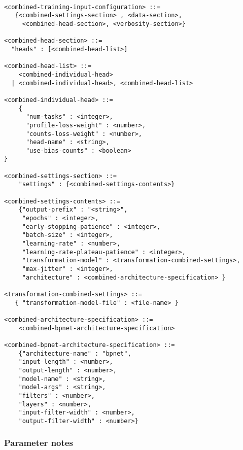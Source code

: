 \documentclass{article}
\begin{document}
\begin{lstlisting}

<combined-training-input-configuration> ::=
   {<combined-settings-section> , <data-section>,
     <combined-head-section>, <verbosity-section>}

<combined-head-section> ::=
  "heads" : [<combined-head-list>]

<combined-head-list> ::=
    <combined-individual-head>
  | <combined-individual-head>, <combined-head-list>

<combined-individual-head> ::=
    {
      "num-tasks" : <integer>,
      "profile-loss-weight" : <number>,
      "counts-loss-weight" : <number>,
      "head-name" : <string>,
      "use-bias-counts" : <boolean>
}

<combined-settings-section> ::=
    "settings" : {<combined-settings-contents>}

<combined-settings-contents> ::=
    {"output-prefix" : "<string>",
     "epochs" : <integer>,
     "early-stopping-patience" : <integer>,
     "batch-size" : <integer>,
     "learning-rate" : <number>,
     "learning-rate-plateau-patience" : <integer>,
     "transformation-model" : <transformation-combined-settings>,
     "max-jitter" : <integer>,
     "architecture" : <combined-architecture-specification> }

<transformation-combined-settings> ::=
   { "transformation-model-file" : <file-name> }

<combined-architecture-specification> ::=
    <combined-bpnet-architecture-specification>

<combined-bpnet-architecture-specification> ::=
    {"architecture-name" : "bpnet",
    "input-length" : <number>,
    "output-length" : <number>,
    "model-name" : <string>,
    "model-args" : <string>,
    "filters" : <number>,
    "layers" : <number>,
    "input-filter-width" : <number>,
    "output-filter-width" : <number>}
\end{lstlisting}

\subsubsection{Parameter notes}
\end{document}
